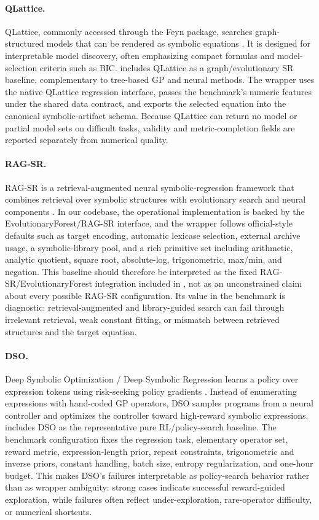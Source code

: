 \paragraph{QLattice.}
QLattice, commonly accessed through the Feyn package, searches graph-structured models that can be rendered as symbolic equations \citep{brolos2021feyn,wilstrup2021small}. It is designed for interpretable model discovery, often emphasizing compact formulas and model-selection criteria such as BIC. \arena{} includes QLattice as a graph/evolutionary SR baseline, complementary to tree-based GP and neural methods. The wrapper uses the native QLattice regression interface, passes the benchmark's numeric features under the shared data contract, and exports the selected equation into the canonical symbolic-artifact schema. Because QLattice can return no model or partial model sets on difficult tasks, validity and metric-completion fields are reported separately from numerical quality.

\paragraph{RAG-SR.}
RAG-SR is a retrieval-augmented neural symbolic-regression framework that combines retrieval over symbolic structures with evolutionary search and neural components \citep{zhang2025ragsr}. In our codebase, the operational implementation is backed by the EvolutionaryForest/RAG-SR interface, and the wrapper follows official-style defaults such as target encoding, automatic lexicase selection, external archive usage, a symbolic-library pool, and a rich primitive set including arithmetic, analytic quotient, square root, absolute-log, trigonometric, max/min, and negation. This baseline should therefore be interpreted as the fixed RAG-SR/EvolutionaryForest integration included in \arena{}, not as an unconstrained claim about every possible RAG-SR configuration. Its value in the benchmark is diagnostic: retrieval-augmented and library-guided search can fail through irrelevant retrieval, weak constant fitting, or mismatch between retrieved structures and the target equation.

\paragraph{DSO.}
Deep Symbolic Optimization / Deep Symbolic Regression learns a policy over expression tokens using risk-seeking policy gradients \citep{petersen2021dsr}. Instead of enumerating expressions with hand-coded GP operators, DSO samples programs from a neural controller and optimizes the controller toward high-reward symbolic expressions. \arena{} includes DSO as the representative pure RL/policy-search baseline. The benchmark configuration fixes the regression task, elementary operator set, reward metric, expression-length prior, repeat constraints, trigonometric and inverse priors, constant handling, batch size, entropy regularization, and one-hour budget. This makes DSO's failures interpretable as policy-search behavior rather than as wrapper ambiguity: strong cases indicate successful reward-guided exploration, while failures often reflect under-exploration, rare-operator difficulty, or numerical shortcuts.

